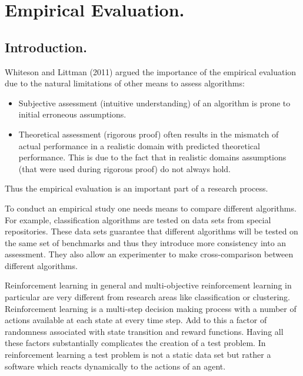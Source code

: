 \chapter{Empirical Evaluation.}

\section{Introduction.}

Whiteson and Littman (2011)\nocite{whiteson2011introduction} argued the importance of the empirical evaluation due to the natural limitations of other means to assess algorithms:

\begin{itemize}
  \item Subjective assessment (intuitive understanding) of an algorithm is prone to initial erroneous assumptions.
  \item Theoretical assessment (rigorous proof) often results in the mismatch of actual performance in a realistic domain with predicted theoretical performance. This is due to the fact that in realistic domains assumptions (that were used during rigorous proof) do not always hold.
\end{itemize}
Thus the empirical evaluation is an important part of a research process.

To conduct an empirical study one needs means to compare different algorithms. For example, classification algorithms are tested on data sets from special repositories. These data sets guarantee that different algorithms will be tested on the same set of benchmarks and thus they introduce more consistency into an assessment. They also allow an experimenter to make cross-comparison between different algorithms.

Reinforcement learning in general and multi-objective reinforcement learning in particular are very different from research areas like classification or clustering. Reinforcement learning is a multi-step decision making process with a number of actions available at each state at every time step. Add to this a factor of randomness associated with state transition and reward functions. Having all these factors substantially complicates the creation of a test problem. In reinforcement learning a test problem is not a static data set but rather a software which reacts dynamically to the actions of an agent.

